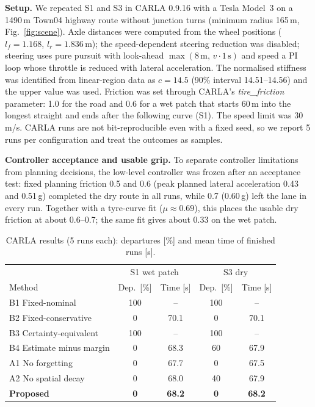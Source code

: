 \documentclass[letterpaper,journal,twoside]{IEEEtran}%
\begin{document}
\textbf{Setup.} We repeated S1 and S3 in CARLA 0.9.16 \cite{dosovitskiy2017} with a Tesla Model~3 on a 1490\,m Town04 highway route without junction turns (minimum radius 165\,m, Fig.~\ref{fig:scene}). Axle distances were computed from the wheel positions ($l_f=1.168$, $l_r=1.836$\,m); the speed-dependent steering reduction was disabled; steering uses pure pursuit with look-ahead $\max(8\,\mathrm{m},\,v\cdot1\,\mathrm{s})$ and speed a PI loop whose throttle is reduced with lateral acceleration. The normalised stiffness was identified from linear-region data as $c=14.5$ (90\% interval 14.51--14.56) and the upper value was used. Friction was set through CARLA's \emph{tire\_friction} parameter: 1.0 for the road and 0.6 for a wet patch that starts 60\,m into the longest straight and ends after the following curve (S1). The speed limit was 30\,m/s. CARLA runs are not bit-reproducible even with a fixed seed, so we report 5 runs per configuration and treat the outcomes as samples.

\textbf{Controller acceptance and usable grip.} To separate controller limitations from planning decisions, the low-level controller was frozen after an acceptance test: fixed planning friction 0.5 and 0.6 (peak planned lateral acceleration 0.43 and 0.51\,g) completed the dry route in all runs, while 0.7 (0.60\,g) left the lane in every run. Together with a tyre-curve fit ($\mu\approx0.69$), this places the usable dry friction at about 0.6--0.7; the same fit gives about 0.33 on the wet patch.

\begin{table}[t]
\centering\footnotesize
\caption{CARLA results (5 runs each): departures [\%] and mean time of finished runs [s].}
\label{tab:carla}
\setlength{\tabcolsep}{2.5pt}
\begin{tabular}{lcccc}
\toprule
 & \multicolumn{2}{c}{S1 wet patch} & \multicolumn{2}{c}{S3 dry}\\
Method & Dep.\ [\%] & Time [s] & Dep.\ [\%] & Time [s]\\
\midrule
B1 Fixed-nominal & 100 & -- & 100 & --\\
B2 Fixed-conservative & 0 & 70.1 & 0 & 70.1\\
B3 Certainty-equivalent & 100 & -- & 100 & --\\
B4 Estimate minus margin & 0 & 68.3 & 60 & 67.9\\
A1 No forgetting & 0 & 67.7 & 0 & 67.5\\
A2 No spatial decay & 0 & 68.0 & 40 & 67.9\\
\textbf{Proposed} & \textbf{0} & \textbf{68.2} & \textbf{0} & \textbf{68.2}\\
\bottomrule
\end{tabular}
\end{table}
\end{document}
